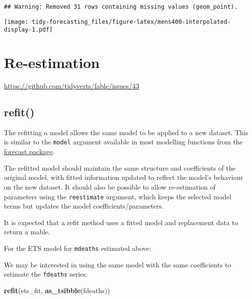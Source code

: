 \documentclass[]{book}
\newenvironment{Shaded}{\begin{snugshade}}{\end{snugshade}}
\newcommand{\KeywordTok}[1]{\textcolor[rgb]{0.13,0.29,0.53}{\textbf{#1}}}
\newcommand{\NormalTok}[1]{#1}
\newcommand{\OperatorTok}[1]{\textcolor[rgb]{0.81,0.36,0.00}{\textbf{#1}}}
\newcommand{\StringTok}[1]{\textcolor[rgb]{0.31,0.60,0.02}{#1}}
\begin{document}
\begin{verbatim}
## Warning: Removed 31 rows containing missing values (geom_point).
\end{verbatim}

\texttt{[image: tidy-forecasting\_files/figure-latex/mens400-interpolated-display-1.pdf]}

\hypertarget{re-estimation}{%
\section{Re-estimation}\label{re-estimation}}

\url{https://github.com/tidyverts/fable/issues/43}

\hypertarget{refit}{%
\subsection{refit()}\label{refit}}

The refitting a model allows the same model to be applied to a new dataset. This is similar to the \texttt{model} argument available in most modelling functions from the \href{https://github.com/robjhyndman/forecast/}{forecast package}.

The refitted model should maintain the same structure and coefficients of the original model, with fitted information updated to reflect the model's behaviour on the new dataset. It should also be possible to allow re-estimation of parameters using the \texttt{reestimate} argument, which keeps the selected model terms but updates the model coefficients/parameters.

It is expected that a refit method uses a fitted model and replacement data to return a mable.

For the ETS model for \texttt{mdeaths} estimated above:

\begin{Shaded}
\end{Shaded}

We may be interested in using the same model with the same coefficients to estimate the \texttt{fdeaths} series:

\begin{Shaded}
\begin{Highlighting}[]
\KeywordTok{refit}\NormalTok{(ets_fit, }\KeywordTok{as_tsibble}\NormalTok{(fdeaths))}
\end{Highlighting}
\end{Shaded}
\end{document}
